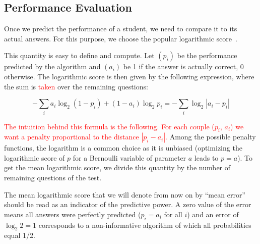 \documentclass{sig-alternate}
\newcommand\alert[1]{\textcolor{red}{#1}}
\begin{document}
\subsection{Performance Evaluation}

Once we predict the performance of a student, we need to compare it to its actual answers. For this purpose, we choose the popular logarithmic score~\cite{Gneiting2007}. 

This quantity is easy to define and compute. Let $(p_i)$ be the performance predicted by the algorithm and $(a_i)$ be 1 if the answer is actually correct, 0 otherwise. The logarithmic score is then given by the following expression, where the sum is \alert{taken} over the remaining questions: 

\[ - \sum_i a_i \log_2 (1 - p_i) + (1-a_i) \log_2 p_i = - \sum_i \log_2 | a_i - p_i | \]

\alert{The intuition behind this formula is the following. For each couple ($p_i$, $a_i$) we want a penalty proportional to the distance $|p_i - a_i|$.} Among the possible penalty functions, the logarithm is a common choice as it is unbiased (optimizing the logarithmic score of $p$ for a Bernoulli variable of parameter $a$ leads to $p=a$). To get the mean logarithmic score, we divide this quantity by the number of remaining questions of the test.

The mean logarithmic score that we will denote from now on by ``mean error'' should be read as an indicator of the predictive power. A zero value of the error means all answers were perfectly predicted ($p_i = a_i$ for all $i$) and an error of $\log_2 2 = 1$ corresponds to a non-informative algorithm of which all probabilities equal 1/2. 

%
\end{document}
